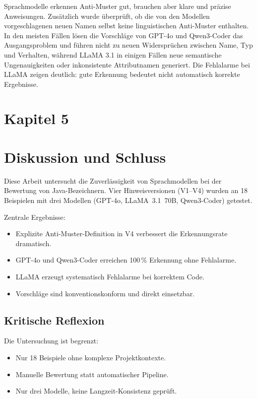 \documentclass[a4paper,12pt]{article}
\begin{document}
Sprachmodelle erkennen Anti-Muster gut, brauchen aber klare und präzise Anweisungen. Zusätzlich wurde überprüft, ob die von den Modellen vorgeschlagenen neuen Namen selbst keine linguistischen Anti-Muster enthalten. In den meisten Fällen lösen die Vorschläge von GPT-4o und Qwen3-Coder das Ausgangsproblem und führen nicht zu neuen Widersprüchen zwischen Name, Typ und Verhalten, während LLaMA 3.1 in einigen Fällen neue semantische Ungenauigkeiten oder inkonsistente Attributnamen generiert. Die Fehlalarme bei LLaMA zeigen deutlich: gute Erkennung bedeutet nicht automatisch korrekte Ergebnisse.

\newpage
\section*{Kapitel 5}
\section{Diskussion und Schluss}

Diese Arbeit untersucht die Zuverlässigkeit von Sprachmodellen bei der Bewertung von Java-Bezeichnern. Vier Hinweisversionen (V1--V4) wurden an 18 Beispielen mit drei Modellen (GPT-4o, LLaMA~3.1~70B, Qwen3-Coder) getestet.%

Zentrale Ergebnisse:%
\begin{itemize}
    \item Explizite Anti-Muster-Definition in V4 verbessert die Erkennungsrate dramatisch.%
    \item GPT-4o und Qwen3-Coder erreichen 100\,\% Erkennung ohne Fehlalarme.%
    \item LLaMA erzeugt systematisch Fehlalarme bei korrektem Code.%
    \item Vorschläge sind konventionskonform und direkt einsetzbar.%
\end{itemize}

\subsection{Kritische Reflexion}

Die Untersuchung ist begrenzt:%
\begin{itemize}
    \item Nur 18 Beispiele ohne komplexe Projektkontexte.%
    \item Manuelle Bewertung statt automatischer Pipeline.%
    \item Nur drei Modelle, keine Langzeit-Konsistenz geprüft.%
\end{itemize}
\end{document}
